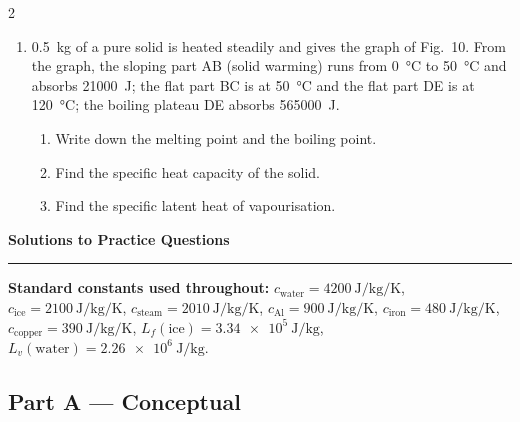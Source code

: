 \documentclass[10pt]{article}
\begin{document}
\begin{multicols}{2}
\begin{tcolorbox}[breakable,enhanced,colback=defbg,colframe=defblue,
  coltitle=white,fonttitle=\bfseries,
  title=Part E --- Graph reading,
  boxrule=0.6pt,arc=2pt]
\begin{enumerate}[leftmargin=*,nosep,label=\textbf{Q\arabic*.},start=22]
  \item \SI{0.5}{\kilogram} of a pure solid is heated steadily and gives
        the graph of Fig.~10. From the graph, the sloping part AB (solid
        warming) runs from \SI{0}{\degreeCelsius} to
        \SI{50}{\degreeCelsius} and absorbs \SI{21000}{\joule}; the flat
        part BC is at \SI{50}{\degreeCelsius} and the flat part DE is at
        \SI{120}{\degreeCelsius}; the boiling plateau DE absorbs
        \SI{565000}{\joule}.
        \begin{enumerate}[leftmargin=*,nosep,label=(\alph*)]
          \item Write down the melting point and the boiling point.
          \item Find the specific heat capacity of the solid.
          \item Find the specific latent heat of vapourisation.
        \end{enumerate}
\end{enumerate}
\end{tcolorbox}

\end{multicols}

\clearpage
\begin{center}
  {\Large\bfseries Solutions to Practice Questions}\\[2pt]
  \rule{\linewidth}{0.6pt}
\end{center}

\textbf{Standard constants used throughout:}
$c_{\text{water}}=\SI{4200}{\joule\per\kilogram\per\kelvin}$,
$c_{\text{ice}}=\SI{2100}{\joule\per\kilogram\per\kelvin}$,
$c_{\text{steam}}=\SI{2010}{\joule\per\kilogram\per\kelvin}$,
$c_{\text{Al}}=\SI{900}{\joule\per\kilogram\per\kelvin}$,
$c_{\text{iron}}=\SI{480}{\joule\per\kilogram\per\kelvin}$,
$c_{\text{copper}}=\SI{390}{\joule\per\kilogram\per\kelvin}$,
$L_f(\text{ice})=\SI{3.34e5}{\joule\per\kilogram}$,
$L_v(\text{water})=\SI{2.26e6}{\joule\per\kilogram}$.

\subsection*{Part A --- Conceptual}
\end{document}
